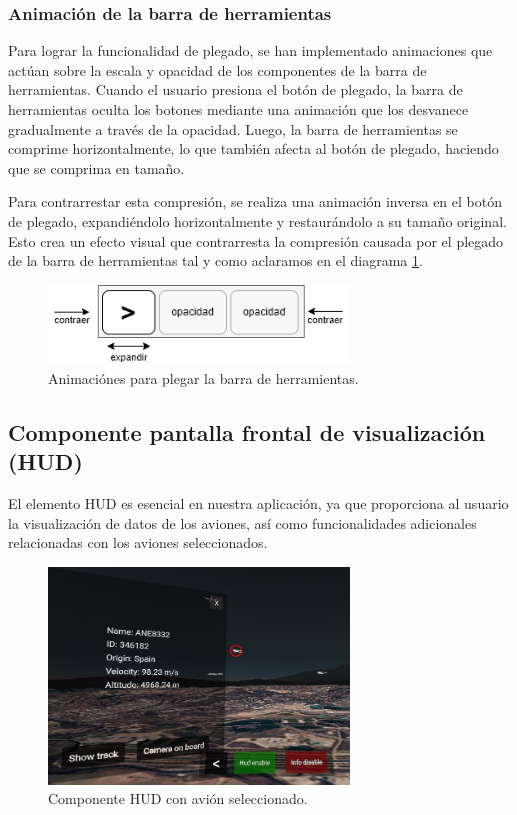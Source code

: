 \documentclass[a4paper, 11pt]{book}
\begin{document}
\subsubsection{Animación de la barra de herramientas}
\label{subsec:animationToolbar}
Para lograr la funcionalidad de plegado, se han implementado animaciones que actúan sobre la escala y opacidad de los componentes de la barra de herramientas. Cuando el usuario presiona el botón de plegado, la barra de herramientas oculta los botones mediante una animación que los desvanece gradualmente a través de la opacidad. Luego, la barra de herramientas se comprime horizontalmente, lo que también afecta al botón de plegado, haciendo que se comprima en tamaño.

Para contrarrestar esta compresión, se realiza una animación inversa en el botón de plegado, expandiéndolo horizontalmente y restaurándolo a su tamaño original. Esto crea un efecto visual que contrarresta la compresión causada por el plegado de la barra de herramientas tal y como aclaramos en el diagrama \ref{fig:animationPlegado}.
\begin{figure}[h]
  \centering
  \includegraphics[width=8cm, keepaspectratio]{img/plegadoToolbar.drawio.png}
  \caption{Animaciónes para plegar la barra de herramientas.}
  \label{fig:animationPlegado}
\end{figure}
\subsection{Componente pantalla frontal de visualización (HUD)}
\label{subsec:hud}
El elemento HUD es esencial en nuestra aplicación, ya que proporciona al usuario la visualización de datos de los aviones, así como funcionalidades adicionales relacionadas con los aviones seleccionados.
\begin{figure}[h]
  \centering
  \includegraphics[width=8cm, keepaspectratio]{img/hud.jpg}
  \caption{Componente HUD con avión seleccionado.}
  \label{fig:hud}
\end{figure}
\end{document}
